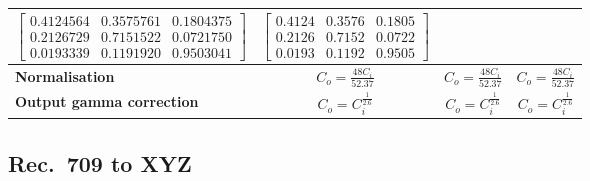\documentclass{article}
\begin{document}
\begin{minipage}{\textwidth}
\begin{tabular}{|l|c|c|c|}
$\left[\begin{array}{lll} 0.4124564 & 0.3575761 & 0.1804375 \\
                          0.2126729 & 0.7151522 & 0.0721750 \\
	                  0.0193339 & 0.1191920 & 0.9503041 \end{array}\right]$ &

$\left[\begin{array}{lll} 0.4124 & 0.3576 & 0.1805 \\
                          0.2126 & 0.7152 & 0.0722 \\
                          0.0193 & 0.1192 & 0.9505 \end{array}\right]$ \\[2em]

\hline
\textbf{Normalisation} &
\parbox[c][4em][c]{3cm}{ \(\displaystyle C_o = \frac{48 C_i}{52.37}\)} &
\parbox[c][4em][c]{3cm}{ \(\displaystyle C_o = \frac{48 C_i}{52.37}\)} &
\parbox[c][4em][c]{3cm}{ \(\displaystyle C_o = \frac{48 C_i}{52.37}\)} \\

\hline
\parbox[c][2em][c]{2cm}{\textbf{Output gamma correction}} &
\parbox[c][4em][c]{3cm}{\(\displaystyle C_o = C_i^{\frac{1}{2.6}} \)} &
\parbox[c][4em][c]{3cm}{\(\displaystyle C_o = C_i^{\frac{1}{2.6}} \)} &
\parbox[c][4em][c]{3cm}{\(\displaystyle C_o = C_i^{\frac{1}{2.6}} \)} \\
\hline

\end{tabular}
\end{minipage}




\subsection{Rec.\ 709 to XYZ}
\end{document}
